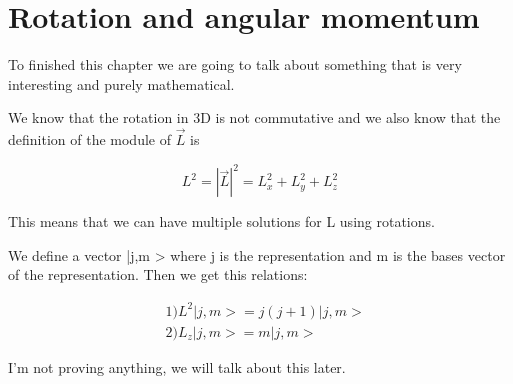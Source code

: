 \section{Rotation and angular momentum}

To finished this chapter we are going to talk about something that is very interesting and purely mathematical. 

We know that the rotation in 3D is not commutative and we also know that the definition of the module of $\vec{L}$ is

\begin{equation}
    \label{module_L}
    L^2=|\Vec{L}|^2=L_{x}^2+L_{y}^2+L_{z}^2
\end{equation}

This means that we can have multiple solutions for L using rotations.

We define a vector |j,m > where j is the representation and m is the bases vector of the representation. Then we get this relations:

\begin{equation}
\label{jm_vec}
    \begin{split}
        &1) L^2| j,m > = j(j+1)| j,m >\\
        &2) L_z| j,m > = m | j,m >
    \end{split}
\end{equation}

I'm not proving anything, we will talk about this later.



